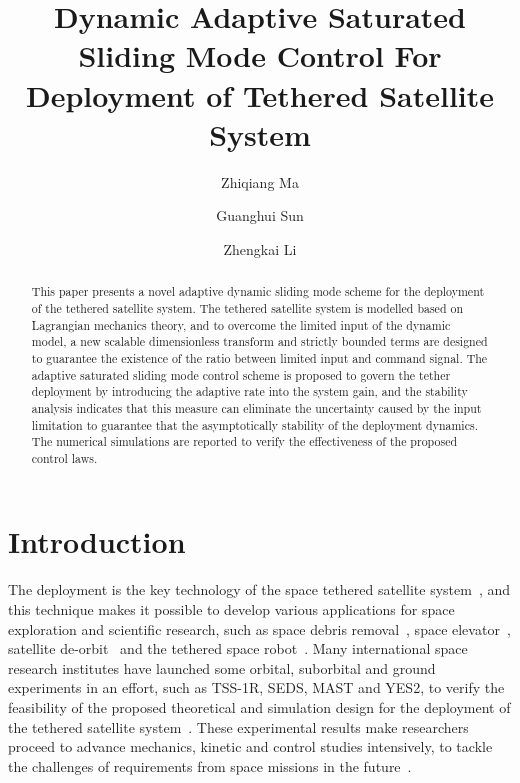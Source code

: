 \documentclass[Journal,letterpaper]{ascelike-new}
\theoremstyle{plain}
\theoremstyle{remark}
\begin{document}
\title{Dynamic Adaptive Saturated Sliding Mode Control For Deployment of Tethered Satellite System}

\author[1]{Zhiqiang Ma}
\author[1]{Guanghui Sun}
\author[1]{Zhengkai Li}


\maketitle

\begin{abstract}
This paper presents a novel adaptive dynamic sliding mode scheme for the deployment of the tethered satellite system. The tethered satellite system is modelled based on Lagrangian mechanics theory, and to overcome the limited input of the dynamic model, a new scalable dimensionless transform and strictly bounded terms are designed to guarantee the existence of the ratio between limited input and command signal. The adaptive saturated sliding mode control scheme is proposed to govern the tether deployment by introducing the adaptive rate into the system gain, and the stability analysis indicates that this measure can eliminate the uncertainty caused by the input limitation to guarantee that the asymptotically stability of the deployment dynamics. The numerical simulations are reported to verify the effectiveness of the proposed control laws.
\end{abstract}

\section{Introduction}
The deployment is the key technology of the space tethered satellite system~\cite{wen2008advances,yousefian2015anti}, and this technique makes it possible to develop various applications for space exploration and scientific research, such as space debris removal~\cite{zhao2014thrust}, space elevator~\cite{kojima2015mission}, satellite de-orbit~\cite{zhong2013dynamics,zhong2013long} and the tethered space robot~\cite{huang2014optimal}. Many international space research institutes have launched some orbital, suborbital and ground experiments in an effort, such as TSS-1R, SEDS, MAST and YES2, to verify the feasibility of the proposed theoretical and simulation design for the deployment of the tethered satellite system~\cite{williams2012review,robitaille2006interpreting,stone1998tss,williams2009yes2}. These experimental results make researchers proceed to advance mechanics, kinetic and control studies intensively, to tackle the challenges of requirements from space missions in the future~\cite{yu2016nonlinear,wen2015space,aslanov2016swing,meng2016lyapunov,zhang2015line}.\par
\end{document}

